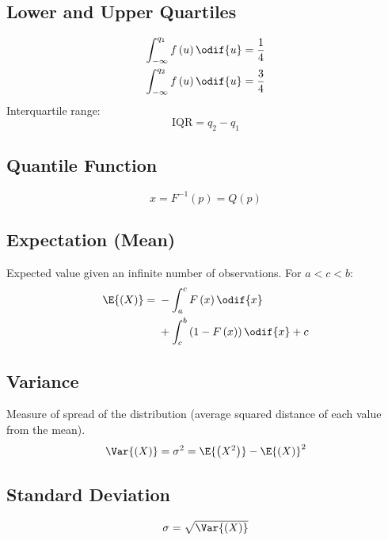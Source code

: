 \documentclass{article}
\begin{document}
\begin{minipage}{126.1962963mm}
\begin{multicols}{2}
        \subsection{Lower and Upper Quartiles}
        \begin{align*}
            \int_{-\infty}^{q_1} f\left( u \right) \odif{u} & = \frac{1}{4} \\
            \int_{-\infty}^{q_2} f\left( u \right) \odif{u} & = \frac{3}{4}
        \end{align*}
        Interquartile range:
        \begin{equation*}
            \mathrm{IQR} = q_2 - q_1
        \end{equation*}
        \subsection{Quantile Function}
        \begin{equation*}
            x = F^{-1}\left( p \right) = Q\left( p \right)
        \end{equation*}
        \subsection{Expectation (Mean)}
        Expected value given an infinite number of observations. For \(a < c < b\):
        \begin{equation*}
            \E{\left(X\right)} = \begin{aligned}[t]
                 & -\int_{a}^c F\left( x \right) \odif{x}                     \\
                 & + \int_c^b \left(1 - F\left( x \right)\right) \odif{x} + c
            \end{aligned}
        \end{equation*}
        \subsection{Variance}
        Measure of spread of the distribution (average squared distance of each value from the mean).
        \begin{equation*}
            \Var{\left( X \right)} = \sigma^2 = \E{\left( X^2 \right)} - \E{\left( X \right)}^2
        \end{equation*}
        \subsection{Standard Deviation}
        \begin{equation*}
            \sigma = \sqrt{\Var{\left( X \right)}}
        \end{equation*}
    \end{multicols}
\end{minipage}\hfill%
\end{document}
